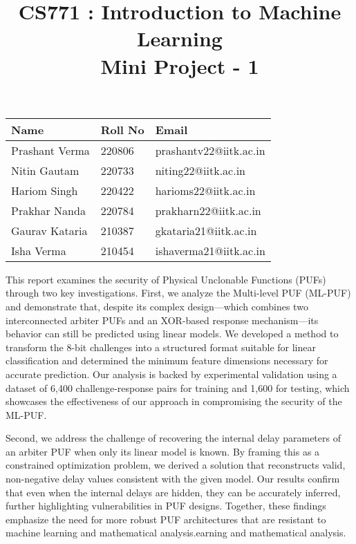 \documentclass[11pt]{article}
\title{\textbf{\Large CS771 : Introduction to Machine Learning \\[5pt] Mini Project - 1}}
\author{}
\date{}
\begin{document}
\maketitle

\begin{tcolorbox}[colback=boxblue!40!white, colframe=blue!60!black, width=\textwidth, boxrule=0.8pt, arc=4pt, auto outer arc]
\centering
\begin{tabular}{@{}lll@{}}
\textbf{Name} & \textbf{Roll No} & \textbf{Email} \\
\midrule
Prashant Verma & 220806 & prashantv22@iitk.ac.in \\
Nitin Gautam & 220733 & niting22@iitk.ac.in \\
Hariom Singh & 220422 & harioms22@iitk.ac.in \\
Prakhar Nanda & 220784 & prakharn22@iitk.ac.in \\
Gaurav Kataria & 210387 & gkataria21@iitk.ac.in \\
Isha Verma & 210454 & ishaverma21@iitk.ac.in \\
\end{tabular}
\end{tcolorbox}

\vspace{1em}

\begin{tcolorbox}[colback=white, colframe=gray, width=\textwidth, boxrule=0.6pt, arc=4pt, auto outer arc, title=\textbf{Abstract}]
This report examines the security of Physical Unclonable Functions (PUFs) through two key investigations. First, we analyze the Multi-level PUF (ML-PUF) and demonstrate that, despite its complex design—which combines two interconnected arbiter PUFs and an XOR-based response mechanism—its behavior can still be predicted using linear models. We developed a method to transform the 8-bit challenges into a structured format suitable for linear classification and determined the minimum feature dimensions necessary for accurate prediction. Our analysis is backed by experimental validation using a dataset of 6,400 challenge-response pairs for training and 1,600 for testing, which showcases the effectiveness of our approach in compromising the security of the ML-PUF.

Second, we address the challenge of recovering the internal delay parameters of an arbiter PUF when only its linear model is known. By framing this as a constrained optimization problem, we derived a solution that reconstructs valid, non-negative delay values consistent with the given model. Our results confirm that even when the internal delays are hidden, they can be accurately inferred, further highlighting vulnerabilities in PUF designs. Together, these findings emphasize the need for more robust PUF architectures that are resistant to machine learning and mathematical analysis.earning and mathematical analysis.
\end{tcolorbox}
\end{document}
